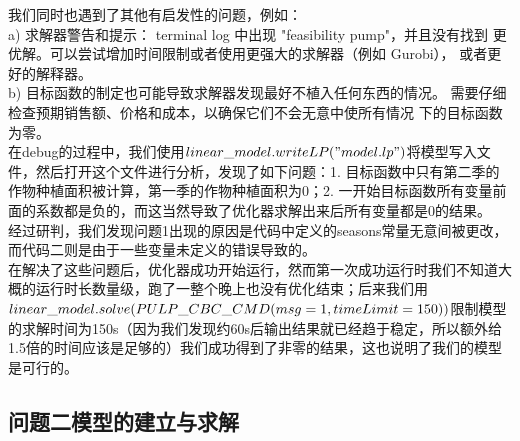 \documentclass{cumcmthesis}
\begin{document}
我们同时也遇到了其他有启发性的问题，例如：\\
a) 求解器警告和提示： terminal log 中出现 "feasibility pump"，并且没有找到
更优解。可以尝试增加时间限制或者使用更强大的求解器（例如 Gurobi），
或者更好的解释器。 \\
b) 目标函数的制定也可能导致求解器发现最好不植入任何东西的情况。
需要仔细检查预期销售额、价格和成本，以确保它们不会无意中使所有情况
下的目标函数为零。 \\

在debug的过程中，我们使用$ linear\_model.writeLP("model.lp") $将模型写入文件，然后打开这个文件进行分析，发现了如下问题：1. 目标函数中只有第二季的作物种植面积被计算，第一季的作物种植面积为0；2. 一开始目标函数所有变量前面的系数都是负的，而这当然导致了优化器求解出来后所有变量都是0的结果。\\
经过研判，我们发现问题1出现的原因是代码中定义的seasons常量无意间被更改，而代码二则是由于一些变量未定义的错误导致的。\\
在解决了这些问题后，优化器成功开始运行，然而第一次成功运行时我们不知道大概的运行时长数量级，跑了一整个晚上也没有优化结束；后来我们用 $ linear\_model.solve(PU\\LP\_CBC\_CMD(msg=1, timeLimit=150)) $限制模型的求解时间为150s（因为我们发现约60s后输出结果就已经趋于稳定，所以额外给1.5倍的时间应该是足够的）我们成功得到了非零的结果，这也说明了我们的模型是可行的。


\subsection{问题二模型的建立与求解}
\end{document}
